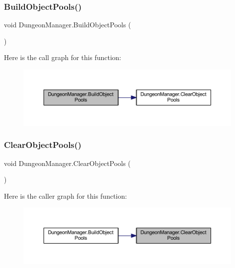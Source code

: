 \mbox{\label{class_dungeon_manager_a5a401d26555b3eff094668620d4857ca}} 
\subsubsection{\texorpdfstring{BuildObjectPools()}{BuildObjectPools()}}
{\footnotesize\ttfamily void Dungeon\+Manager.\+Build\+Object\+Pools (\begin{DoxyParamCaption}{ }\end{DoxyParamCaption})}

Here is the call graph for this function\+:\nopagebreak
\begin{figure}[H]
\begin{center}
\leavevmode
\includegraphics[width=350pt]{class_dungeon_manager_a5a401d26555b3eff094668620d4857ca_cgraph}
\end{center}
\end{figure}
\mbox{\label{class_dungeon_manager_a693d00ae1ca65d58dab634deaa9cfec9}} 
\subsubsection{\texorpdfstring{ClearObjectPools()}{ClearObjectPools()}}
{\footnotesize\ttfamily void Dungeon\+Manager.\+Clear\+Object\+Pools (\begin{DoxyParamCaption}{ }\end{DoxyParamCaption})}

Here is the caller graph for this function\+:\nopagebreak
\begin{figure}[H]
\begin{center}
\leavevmode
\includegraphics[width=350pt]{class_dungeon_manager_a693d00ae1ca65d58dab634deaa9cfec9_icgraph}
\end{center}
\end{figure}
\mbox{\label{class_dungeon_manager_ab7edf3b19e13892178a34ece10f4c5d5}} 
